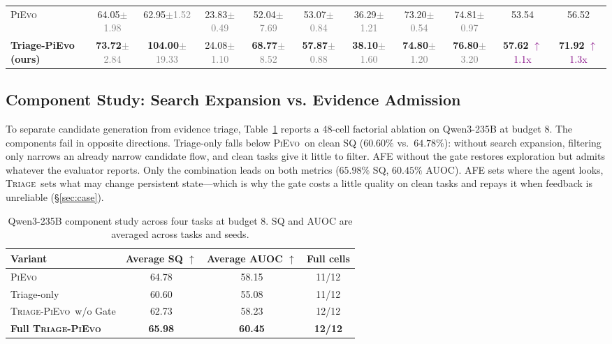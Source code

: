 \documentclass{article}
\newcommand{\triage}{\textsc{Triage}\,}
\newcommand{\method}{\textsc{Triage-PiEvo}\,}
\newcommand{\pievo}{\textsc{PiEvo}\,}
\begin{document}
\begin{table}[!ht]
{\begin{tabular}{l | cc | cc | cc | cc | cc}
\pievo{} & 64.05\textcolor{gray}{\tiny$\pm$1.98} & 62.95\textcolor{gray}{\tiny$\pm$1.52} & 23.83\textcolor{gray}{\tiny$\pm$0.49} & 52.04\textcolor{gray}{\tiny$\pm$7.69} & 53.07\textcolor{gray}{\tiny$\pm$0.84} & 36.29\textcolor{gray}{\tiny$\pm$1.21} & 73.20\textcolor{gray}{\tiny$\pm$0.54} & 74.81\textcolor{gray}{\tiny$\pm$0.97} & 53.54 & 56.52 \\
\textbf{Triage-PiEvo (ours)} & \textbf{73.72}\textcolor{gray}{\tiny$\pm$2.84} & \textbf{104.00}\textcolor{gray}{\tiny$\pm$19.33} & 24.08\textcolor{gray}{\tiny$\pm$1.10} & \textbf{68.77}\textcolor{gray}{\tiny$\pm$8.52} & \textbf{57.87}\textcolor{gray}{\tiny$\pm$0.88} & \textbf{38.10}\textcolor{gray}{\tiny$\pm$1.60} & \textbf{74.80}\textcolor{gray}{\tiny$\pm$1.20} & \textbf{76.80}\textcolor{gray}{\tiny$\pm$3.20} & \textbf{57.62} \textcolor{purple}{\small $\uparrow$ 1.1x} & \textbf{71.92} \textcolor{purple}{\small $\uparrow$ 1.3x} \\
\bottomrule
\end{tabular}%
}
\end{table}



\subsection{Component Study: Search Expansion vs. Evidence Admission}
\label{sec:ablation}

To separate candidate generation from evidence triage, Table~\ref{tab:qwen-factorial} reports a 48-cell factorial ablation on Qwen3-235B at budget 8. The components fail in opposite directions. Triage-only falls below \pievo{} on clean SQ ($60.60\%$ vs.\ $64.78\%$): without search expansion, filtering only narrows an already narrow candidate flow, and clean tasks give it little to filter. AFE without the gate restores exploration but admits whatever the evaluator reports. Only the combination leads on both metrics ($65.98\%$ SQ, $60.45\%$ AUOC). AFE sets where the agent looks, \triage{} sets what may change persistent state---which is why the gate costs a little quality on clean tasks and repays it when feedback is unreliable (§\ref{sec:case}).

\begin{table}[!ht]
\caption{Qwen3-235B component study across four tasks at budget 8. SQ and AUOC are averaged across tasks and seeds.}
\label{tab:qwen-factorial}
\centering
\small
\begin{tabular}{lccc}
\toprule
Variant & Average SQ $\uparrow$ & Average AUOC $\uparrow$ & Full cells \\
\midrule
\pievo{} & 64.78 & 58.15 & 11/12 \\
Triage-only & 60.60 & 55.08 & 11/12 \\
\method{} w/o Gate & 62.73 & 58.23 & 12/12 \\
\textbf{Full \method{}} & \textbf{65.98} & \textbf{60.45} & \textbf{12/12} \\
\bottomrule
\end{tabular}
\end{table}
\end{document}
